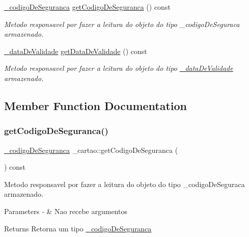\begin{DoxyCompactItemize}
\mbox{\hyperlink{class__codigo_de_seguranca}{\+\_\+codigo\+De\+Seguranca}} \mbox{\hyperlink{class__cartao_a7bcd6837663f4e44cde252772630f961}{get\+Codigo\+De\+Seguranca}} () const
\begin{DoxyCompactList}\small\item\em Metodo responsavel por fazer a leitura do objeto do tipo \+\_\+codigo\+De\+Seguraca armazenado. \end{DoxyCompactList}\item 
\mbox{\hyperlink{class__data_de_validade}{\+\_\+data\+De\+Validade}} \mbox{\hyperlink{class__cartao_ae9cca09e19b37d685151b96b662919f1}{get\+Data\+De\+Validade}} () const
\begin{DoxyCompactList}\small\item\em Metodo responsavel por fazer a leitura do objeto do tipo \mbox{\hyperlink{class__data_de_validade}{\+\_\+data\+De\+Validade}} armazenado. \end{DoxyCompactList}\end{DoxyCompactItemize}


\subsection{Member Function Documentation}
\mbox{\label{class__cartao_a7bcd6837663f4e44cde252772630f961}} 
\subsubsection{\texorpdfstring{getCodigoDeSeguranca()}{getCodigoDeSeguranca()}}
{\footnotesize\ttfamily \mbox{\hyperlink{class__codigo_de_seguranca}{\+\_\+codigo\+De\+Seguranca}} \+\_\+cartao\+::get\+Codigo\+De\+Seguranca (\begin{DoxyParamCaption}{ }\end{DoxyParamCaption}) const}



Metodo responsavel por fazer a leitura do objeto do tipo \+\_\+codigo\+De\+Seguraca armazenado. 


\begin{DoxyParams}{Parameters}
{\em -\/} & Nao recebe argumentos \\
\hline
\end{DoxyParams}
\begin{DoxyReturn}{Returns}
Retorna um tipo \mbox{\hyperlink{class__codigo_de_seguranca}{\+\_\+codigo\+De\+Seguranca}} 
\end{DoxyReturn}
\mbox{\label{class__cartao_ae9cca09e19b37d685151b96b662919f1}} 
